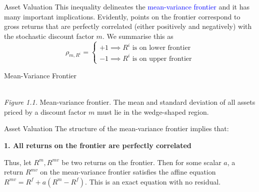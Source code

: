 \documentclass[aspectratio=169,xcolor=dvipsnames]{beamer}
\begin{document}
\begin{frame}{Asset Valuation}
    This inequality delineates the \textcolor{blue}{mean-variance frontier} and it has many important implications. Evidently, points on the frontier correspond to gross returns that are perfectly correlated (either positively and negatively) with the stochastic discount factor $m$. We summarise this as
    \[
        \rho_{m, R^i} = \begin{cases} +1 \implies R^i \text{ is on lower frontier} \\ -1 \implies R^i \text{ is on upper frontier} \end{cases}
    \]
\end{frame}

\begin{frame}{Mean-Variance Frontier}
    \centering
    \\
    \footnotesize \textit{Figure 1.1.} Mean-variance frontier. The mean and standard deviation of all assets priced by a discount factor $m$ must lie in the wedge-shaped region.
\end{frame}

\begin{frame}{Asset Valuation}
    The structure of the mean-variance frontier implies that:

    \textbf{1. All returns on the frontier are perfectly correlated}

    Thus, let $R^m, R^{mv}$ be two returns on the frontier. Then for some scalar $a$, a return $R^{mv}$ on the mean-variance frontier satisfies the affine equation $R^{mv} = R^f + a(R^m - R^f)$. This is an exact equation with no residual.
\end{frame}
\end{document}
